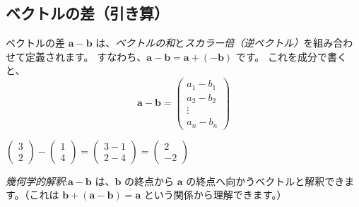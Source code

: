 \subsection{ベクトルの差（引き算）}
ベクトルの差 $\bm{a} - \bm{b}$ は、\emph{ベクトルの和}と\emph{スカラー倍（逆ベクトル）}を組み合わせて定義されます。
すなわち、$\bm{a} - \bm{b} = \bm{a} + (-\bm{b})$ です。
これを成分で書くと、
\[\bm{a} - \bm{b} = \begin{pmatrix} a_1 - b_1 \\ a_2 - b_2 \\ \vdots \\ a_n - b_n \end{pmatrix}\]
\begin{ex}
$\begin{pmatrix} 3 \\ 2 \end{pmatrix} - \begin{pmatrix} 1 \\ 4 \end{pmatrix} = \begin{pmatrix} 3 - 1 \\ 2 - 4 \end{pmatrix} = \begin{pmatrix} 2 \\ -2 \end{pmatrix}$
\end{ex}

\emph{幾何学的解釈}:$\bm{a} - \bm{b}$ は、$\bm{b}$ の終点から $\bm{a}$ の終点へ向かうベクトルと解釈できます。（これは $\bm{b} + (\bm{a} - \bm{b}) = \bm{a}$ という関係から理解できます。）

